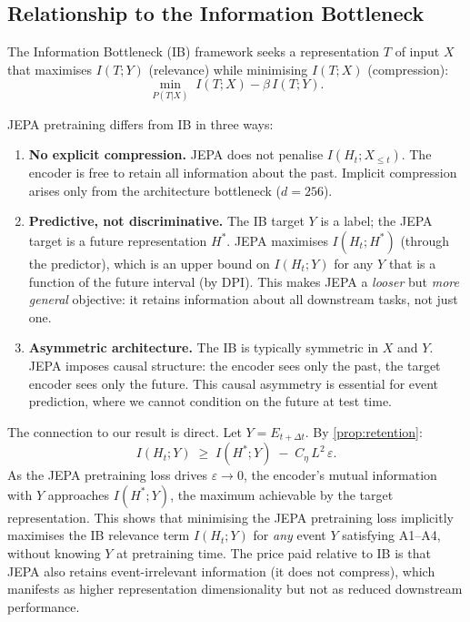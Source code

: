 \subsection{Relationship to the Information Bottleneck}
\label{app:ib_relationship}

The Information Bottleneck (IB) framework \citep{tishby2000information} seeks a representation $T$ of input $X$ that maximises $I(T; Y)$ (relevance) while minimising $I(T; X)$ (compression):
\begin{equation}
  \min_{P(T|X)} \; I(T; X) - \beta\, I(T; Y).
\end{equation}

JEPA pretraining differs from IB in three ways:

\begin{enumerate}[nosep]
  \item \textbf{No explicit compression.}
  JEPA does not penalise $I(H_t; X_{\leq t})$. The encoder is free to retain all information about the past. Implicit compression arises only from the architecture bottleneck ($d = 256$).

  \item \textbf{Predictive, not discriminative.}
  The IB target $Y$ is a label; the JEPA target is a future representation $H^*$. JEPA maximises $I(H_t; H^*)$ (through the predictor), which is an upper bound on $I(H_t; Y)$ for any $Y$ that is a function of the future interval (by DPI). This makes JEPA a \emph{looser} but \emph{more general} objective: it retains information about all downstream tasks, not just one.

  \item \textbf{Asymmetric architecture.}
  The IB is typically symmetric in $X$ and $Y$. JEPA imposes causal structure: the encoder sees only the past, the target encoder sees only the future. This causal asymmetry is essential for event prediction, where we cannot condition on the future at test time.
\end{enumerate}

The connection to our result is direct. Let $Y = E_{t+\Delta t}$. By \cref{prop:retention}:
\begin{equation}
  I(H_t; Y) \;\geq\; I(H^*; Y) \;-\; C_\eta\,L^2\,\varepsilon.
\end{equation}
As the JEPA pretraining loss drives $\varepsilon \to 0$, the encoder's mutual information with $Y$ approaches $I(H^*; Y)$, the maximum achievable by the target representation.
This shows that minimising the JEPA pretraining loss implicitly maximises the IB relevance term $I(H_t; Y)$ for \emph{any} event $Y$ satisfying A1--A4, without knowing $Y$ at pretraining time.
The price paid relative to IB is that JEPA also retains event-irrelevant information (it does not compress), which manifests as higher representation dimensionality but not as reduced downstream performance.

